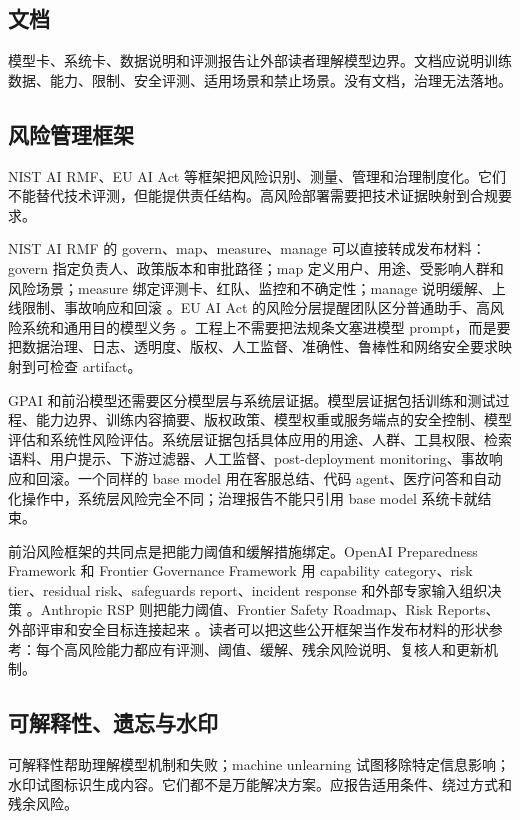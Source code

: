 \documentclass[UTF8,zihao=-4,openany]{ctexbook}
\begin{document}
\subsection{文档}
模型卡、系统卡、数据说明和评测报告让外部读者理解模型边界。文档应说明训练数据、能力、限制、安全评测、适用场景和禁止场景。没有文档，治理无法落地。

\subsection{风险管理框架}
NIST AI RMF、EU AI Act 等框架把风险识别、测量、管理和治理制度化。它们不能替代技术评测，但能提供责任结构。高风险部署需要把技术证据映射到合规要求。

NIST AI RMF 的 govern、map、measure、manage 可以直接转成发布材料：govern 指定负责人、政策版本和审批路径；map 定义用户、用途、受影响人群和风险场景；measure 绑定评测卡、红队、监控和不确定性；manage 说明缓解、上线限制、事故响应和回滚 \cite{nist2023airmf,nist2024genai}。EU AI Act 的风险分层提醒团队区分普通助手、高风险系统和通用目的模型义务 \cite{europeanunion2024aiact}。工程上不需要把法规条文塞进模型 prompt，而是要把数据治理、日志、透明度、版权、人工监督、准确性、鲁棒性和网络安全要求映射到可检查 artifact。

GPAI 和前沿模型还需要区分模型层与系统层证据。模型层证据包括训练和测试过程、能力边界、训练内容摘要、版权政策、模型权重或服务端点的安全控制、模型评估和系统性风险评估。系统层证据包括具体应用的用途、人群、工具权限、检索语料、用户提示、下游过滤器、人工监督、post-deployment monitoring、事故响应和回滚。一个同样的 base model 用在客服总结、代码 agent、医疗问答和自动化操作中，系统层风险完全不同；治理报告不能只引用 base model 系统卡就结束。

前沿风险框架的共同点是把能力阈值和缓解措施绑定。OpenAI Preparedness Framework 和 Frontier Governance Framework 用 capability category、risk tier、residual risk、safeguards report、incident response 和外部专家输入组织决策 \cite{openai2025preparedness,openai2026frontiergovernance}。Anthropic RSP 则把能力阈值、Frontier Safety Roadmap、Risk Reports、外部评审和安全目标连接起来 \cite{anthropic2026rspv3}。读者可以把这些公开框架当作发布材料的形状参考：每个高风险能力都应有评测、阈值、缓解、残余风险说明、复核人和更新机制。

\subsection{可解释性、遗忘与水印}
可解释性帮助理解模型机制和失败；machine unlearning 试图移除特定信息影响；水印试图标识生成内容。它们都不是万能解决方案。应报告适用条件、绕过方式和残余风险。
\end{document}
